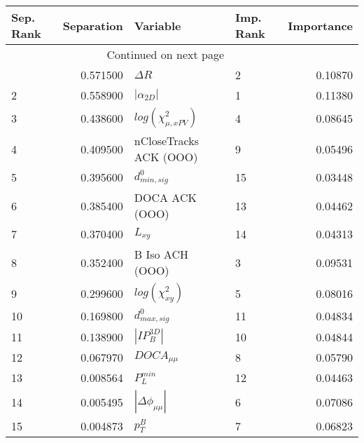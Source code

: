 \usepackage{lscape}

\begin{landscape}
\begin{longtable}{lrllr}
\toprule
Sep. Rank &  Separation &                   Variable & Imp. Rank &  Importance \\
\midrule
\endhead
\midrule
\multicolumn{3}{r}{{Continued on next page}} \\
\midrule
\endfoot

\bottomrule
\endlastfoot
        1 &    0.571500 &                 $\Delta R$ &         2 &     0.10870 \\
        2 &    0.558900 &            $|\alpha_{2D}|$ &         1 &     0.11380 \\
        3 &    0.438600 &  $log(\chi^{2}_{\mu,xPV})$ &         4 &     0.08645 \\
        4 &    0.409500 &     nCloseTracks ACK (OOO) &         9 &     0.05496 \\
        5 &    0.395600 &           $d^0_{min, sig}$ &        15 &     0.03448 \\
        6 &    0.385400 &             DOCA ACK (OOO) &        13 &     0.04462 \\
        7 &    0.370400 &                   $L_{xy}$ &        14 &     0.04313 \\
        8 &    0.352400 &            B Iso ACH (OOO) &         3 &     0.09531 \\
        9 &    0.299600 &       $log(\chi^{2}_{xy})$ &         5 &     0.08016 \\
       10 &    0.169800 &           $d^0_{max, sig}$ &        11 &     0.04834 \\
       11 &    0.138900 &            $|IP_{B}^{3D}|$ &        10 &     0.04844 \\
       12 &    0.067970 &            $DOCA_{\mu\mu}$ &         8 &     0.05790 \\
       13 &    0.008564 &              $P^{min}_{L}$ &        12 &     0.04463 \\
       14 &    0.005495 &   $|\Delta \phi_{\mu\mu}|$ &         6 &     0.07086 \\
       15 &    0.004873 &                  $p^B_{T}$ &         7 &     0.06823 \\
\end{longtable}

\end{landscape}
